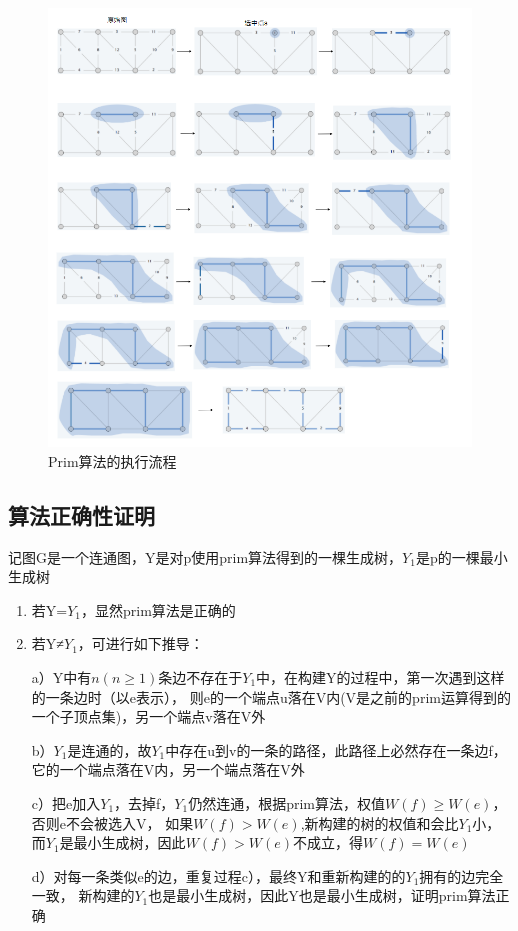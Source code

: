 \begin{figure}[hbt]
	\centering
	\includegraphics[scale=0.5]{image/prim.png}
	\caption{Prim算法的执行流程}\label{fig:Prim}
\end{figure}

\subsection{算法正确性证明}
记图G是一个连通图，Y是对p使用prim算法得到的一棵生成树，$Y_1$是p的一棵最小生成树
\begin{enumerate}
	\item 若Y=$Y_1$，显然prim算法是正确的
	\item 若Y≠$Y_1$，可进行如下推导：

	a）Y中有$n( n \geq 1 )$条边不存在于$Y_1$中，在构建Y的过程中，第一次遇到这样的一条边时（以e表示），
	则e的一个端点u落在V内(V是之前的prim运算得到的一个子顶点集)，另一个端点v落在V外
	
	b）$Y_1$是连通的，故$Y_1$中存在u到v的一条的路径，此路径上必然存在一条边f，它的一个端点落在V内，另一个端点落在V外
	
	c）把e加入$Y_1$，去掉f，$Y_1$仍然连通，根据prim算法，权值$W(f) \geq W(e)$，否则e不会被选入V，
	如果$W(f)>W(e)$,新构建的树的权值和会比$Y_1$小，而$Y_1$是最小生成树，因此$W(f)>W(e)$不成立，得$W(f)=W(e)$
	
	d）对每一条类似e的边，重复过程c），最终Y和重新构建的的$Y_1$拥有的边完全一致，
	新构建的$Y_1$也是最小生成树，因此Y也是最小生成树，证明prim算法正确
\end{enumerate}

